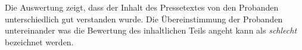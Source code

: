 Die Auswertung zeigt, dass der Inhalt des Pressetextes von den Probanden
unterschiedlich gut verstanden wurde. Die Übereinstimmung der Probanden
untereinander was die Bewertung des inhaltlichen Teils angeht kann als
\emph{schlecht} bezeichnet werden.








